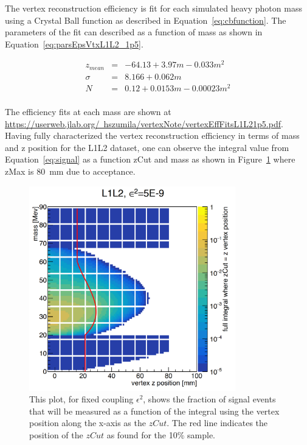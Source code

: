 \documentclass[twoside]{article}
\begin{document}
The vertex reconstruction efficiency is fit for each simulated heavy photon mass using a Crystal Ball function as described in Equation~\eqref{eq:cbfunction}. The parameters of the fit can described as a function of mass as shown in Equation~\eqref{eq:parsEpsVtxL1L2_1p5}.

\begin{eqnarray*}
\label{eq:parsEpsVtxL1L2_1p5}
z_{mean} & = & -64.13+3.97m-0.033m^2 \\
\sigma & = & 8.166+0.062m \\
N & = & 0.12+0.0153m-0.00023m^2 \\
\end{eqnarray*}

The efficiency fits at each mass are shown at  \href{url}{https://userweb.jlab.org/~hszumila/vertexNote/vertexEffFitsL1L21p5.pdf}. Having fully characterized the vertex reconstruction efficiency in terms of mass and z position for the L1L2 dataset, one can observe the integral value from Equation~\eqref{eq:signal} as a function zCut and mass as shown in Figure~\ref{fig:integral_L1L2_1p5} where zMax is 80~mm due to acceptance.

\begin{figure}[H]
  \centering
     \includegraphics[width=0.8\textwidth]{plots/L1L2_eff1p5_zm.png}
  \caption{This plot, for fixed coupling $\epsilon^2$, shows the fraction of signal events that will be measured as a function of the integral using the vertex position along the x-axis as the $zCut$. The red line indicates the position of the $zCut$ as found for the 10$\%$ sample.}
  \label{fig:integral_L1L2_1p5}
\end{figure} 
\end{document}

